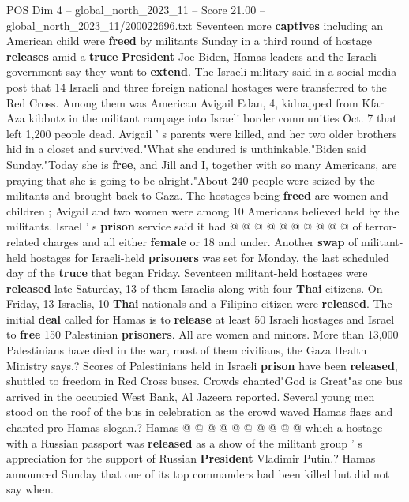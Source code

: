 \begin{textsample}{POS Dim 4 – global\_north\_2023\_11 – Score 21.00 – global\_north\_2023\_11/200022696.txt}  \label{ex:f4_pos_273}
Seventeen more \textbf{captives} including an American child were \textbf{freed} by militants Sunday in a third round of hostage \textbf{releases} amid a \textbf{truce} \textbf{President} Joe Biden, Hamas leaders and the Israeli government say they want to \textbf{extend}.
The Israeli military said in a social media post that 14 Israeli and three foreign national hostages were transferred to the Red Cross.
Among them was American Avigail Edan, 4, kidnapped from Kfar Aza kibbutz in the militant rampage into Israeli border communities Oct. 7 that left 1,200 people dead.
Avigail ' s parents were killed, and her two older brothers hid in a closet and survived."What she endured is unthinkable,"Biden said Sunday."Today she is \textbf{free}, and Jill and I, together with so many Americans, are praying that she is going to be alright."About 240 people were seized by the militants and brought back to Gaza.
The hostages being \textbf{freed} are women and children ; Avigail and two women were among 10 Americans believed held by the militants.
Israel ' s \textbf{prison} service said it had @ @ @ @ @ @ @ @ @ @ of terror-related charges and all either \textbf{female} or 18 and under.
Another \textbf{swap} of militant-held hostages for Israeli-held \textbf{prisoners} was set for Monday, the last scheduled day of the \textbf{truce} that began Friday.
Seventeen militant-held hostages were \textbf{released} late Saturday, 13 of them Israelis along with four \textbf{Thai} citizens.
On Friday, 13 Israelis, 10 \textbf{Thai} nationals and a Filipino citizen were \textbf{released}.
The initial \textbf{deal} called for Hamas is to \textbf{release} at least 50 Israeli hostages and Israel to \textbf{free} 150 Palestinian \textbf{prisoners}.
All are women and minors.
More than 13,000 Palestinians have died in the war, most of them civilians, the Gaza Health Ministry says.?
Scores of Palestinians held in Israeli \textbf{prison} have been \textbf{released}, shuttled to freedom in Red Cross buses.
Crowds chanted"God is Great"as one bus arrived in the occupied West Bank, Al Jazeera reported.
Several young men stood on the roof of the bus in celebration as the crowd waved Hamas flags and chanted pro-Hamas slogan.?
Hamas @ @ @ @ @ @ @ @ @ @ which a hostage with a Russian passport was \textbf{released} as a show of the militant group ' s appreciation for the support of Russian \textbf{President} Vladimir Putin.?
Hamas announced Sunday that one of its top commanders had been killed but did not say when.

\end{textsample}
